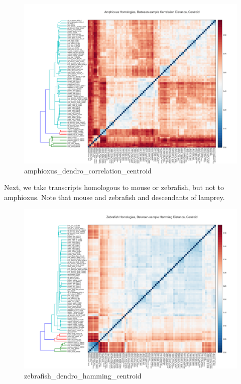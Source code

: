 \documentclass{article}
\begin{document}
\begin{figure}[htbp]
\centering
\includegraphics{amphioxus_dendro_correlation_centroid.svg}
\caption{amphioxus\_dendro\_correlation\_centroid}
\end{figure}

Next, we take transcripts homologous to mouse or zebrafish, but not to
amphioxus. Note that mouse and zebrafish and descendants of lamprey.

\begin{figure}[htbp]
\centering
\includegraphics{zebrafish_dendro_hamming_centroid.svg}
\caption{zebrafish\_dendro\_hamming\_centroid}
\end{figure}
\end{document}
